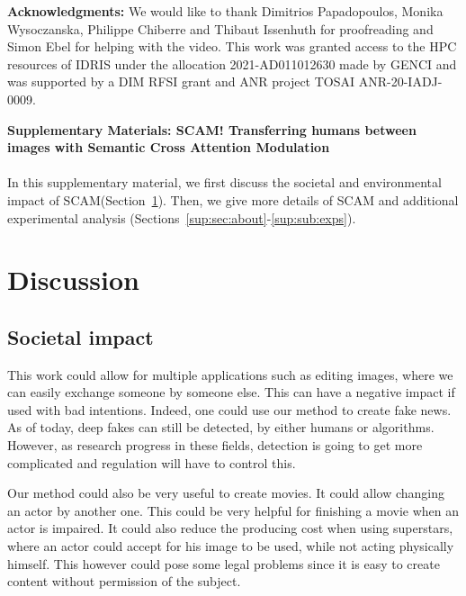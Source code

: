 \documentclass[runningheads]{llncs}
\makeatletter
\renewcommand{\appendixname}{
\begin{center}
\textbf{\Large Supplementary Materials: SCAM! Transferring humans between images with Semantic Cross Attention Modulation}
\end{center}
}
\newcommand{\mname}{SCAM\@\xspace}
\makeatother
\begin{document}
\noindent\textbf{Acknowledgments: }We would like to thank Dimitrios Papadopoulos, Monika Wysoczanska, Philippe Chiberre and Thibaut Issenhuth for proofreading and Simon Ebel for helping with the video. This work was granted access to the HPC resources of IDRIS under the allocation 2021-AD011012630 made by GENCI and 
was supported by a DIM RFSI grant and ANR project TOSAI
ANR-20-IADJ-0009.

\clearpage


\clearpage



\appendix
\appendixname




\paragraph{}
In this supplementary material, we first discuss the societal and environmental impact of \mname (Section~\ref{sup:sec:discussion}). 
Then, we give more details of \mname and additional experimental analysis (Sections~\ref{sup:sec:about}-\ref{sup:sub:exps}).

\section{Discussion}
\label{sup:sec:discussion}

\subsection{Societal impact}
This work could allow for multiple applications such as editing images, where we can easily exchange someone by someone else. This can have a negative impact if used with bad intentions. Indeed, one could use our method to create fake news. As of today, deep fakes can still be detected, by either humans or algorithms. However, as research progress in these fields, detection is going to get more complicated and regulation will have to control this.

Our method could also be very useful to create movies. It could allow changing an actor by another one. This could be very helpful for finishing a movie when an actor is impaired. It could also reduce the producing cost when using superstars, where an actor could accept for his image to be used, while not acting physically himself. This however could pose some legal problems since it is easy to create content without permission of the subject.
\end{document}
